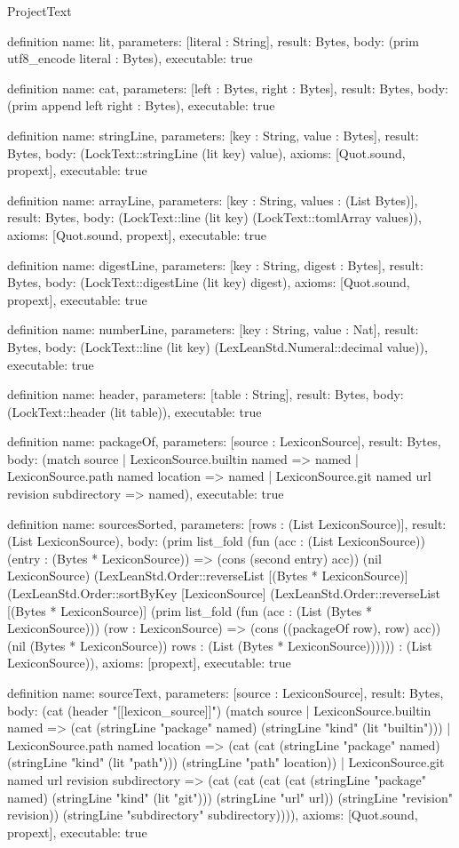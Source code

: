 \begin{lexlean}{ProjectText}
\begin{semanticmodule}
definition{
  name: lit,
  parameters: [literal : String],
  result: Bytes,
  body: (prim utf8_encode literal : Bytes),
  executable: true
}

definition{
  name: cat,
  parameters: [left : Bytes, right : Bytes],
  result: Bytes,
  body: (prim append left right : Bytes),
  executable: true
}

definition{
  name: stringLine,
  parameters: [key : String, value : Bytes],
  result: Bytes,
  body: (LockText::stringLine (lit key) value),
  axioms: [Quot.sound, propext],
  executable: true
}

definition{
  name: arrayLine,
  parameters: [key : String, values : (List Bytes)],
  result: Bytes,
  body: (LockText::line (lit key) (LockText::tomlArray values)),
  axioms: [Quot.sound, propext],
  executable: true
}

definition{
  name: digestLine,
  parameters: [key : String, digest : Bytes],
  result: Bytes,
  body: (LockText::digestLine (lit key) digest),
  axioms: [Quot.sound, propext],
  executable: true
}

definition{
  name: numberLine,
  parameters: [key : String, value : Nat],
  result: Bytes,
  body: (LockText::line (lit key) (LexLeanStd.Numeral::decimal value)),
  executable: true
}

definition{
  name: header,
  parameters: [table : String],
  result: Bytes,
  body: (LockText::header (lit table)),
  executable: true
}

definition{
  name: packageOf,
  parameters: [source : LexiconSource],
  result: Bytes,
  body: (match source
    | LexiconSource.builtin named => named
    | LexiconSource.path named location => named
    | LexiconSource.git named url revision subdirectory => named),
  executable: true
}

definition{
  name: sourcesSorted,
  parameters: [rows : (List LexiconSource)],
  result: (List LexiconSource),
  body: (prim list_fold (fun (acc : (List LexiconSource)) (entry : (Bytes * LexiconSource)) => (cons (second entry) acc)) (nil LexiconSource) (LexLeanStd.Order::reverseList [(Bytes * LexiconSource)] (LexLeanStd.Order::sortByKey [LexiconSource] (LexLeanStd.Order::reverseList [(Bytes * LexiconSource)] (prim list_fold (fun (acc : (List (Bytes * LexiconSource))) (row : LexiconSource) => (cons ((packageOf row), row) acc)) (nil (Bytes * LexiconSource)) rows : (List (Bytes * LexiconSource)))))) : (List LexiconSource)),
  axioms: [propext],
  executable: true
}

definition{
  name: sourceText,
  parameters: [source : LexiconSource],
  result: Bytes,
  body: (cat (header "[[lexicon_source]]") (match source
    | LexiconSource.builtin named => (cat (stringLine "package" named) (stringLine "kind" (lit "builtin")))
    | LexiconSource.path named location => (cat (cat (stringLine "package" named) (stringLine "kind" (lit "path"))) (stringLine "path" location))
    | LexiconSource.git named url revision subdirectory => (cat (cat (cat (cat (stringLine "package" named) (stringLine "kind" (lit "git"))) (stringLine "url" url)) (stringLine "revision" revision)) (stringLine "subdirectory" subdirectory)))),
  axioms: [Quot.sound, propext],
  executable: true
}


\end{semanticmodule}
\end{lexlean}
